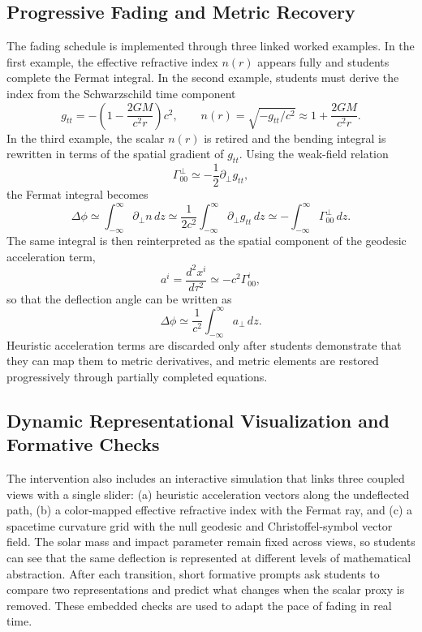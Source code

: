 \documentclass{article}
\begin{document}
\subsection{Progressive Fading and Metric Recovery}
The fading schedule is implemented through three linked worked examples. In the first example, the effective refractive index \(n(r)\) appears fully and students complete the Fermat integral. In the second example, students must derive the index from the Schwarzschild time component
\begin{equation}
g_{tt}
=
-\left(1-\frac{2GM}{c^{2}r}\right)c^{2},
\qquad
n(r)
=
\sqrt{-g_{tt}/c^{2}}
\approx
1+\frac{2GM}{c^{2}r}.
\end{equation}
In the third example, the scalar \(n(r)\) is retired and the bending integral is rewritten in terms of the spatial gradient of \(g_{tt}\). Using the weak-field relation
\begin{equation}
\Gamma^{\perp}_{00}
\simeq
-\frac{1}{2}\partial_{\perp}g_{tt},
\end{equation}
the Fermat integral becomes
\begin{equation}
\Delta \phi
\simeq
\int_{-\infty}^{\infty}
\partial_{\perp} n
\,dz
\simeq
\frac{1}{2c^{2}}
\int_{-\infty}^{\infty}
\partial_{\perp}g_{tt}
\,dz
\simeq
-\int_{-\infty}^{\infty}
\Gamma^{\perp}_{00}
\,dz.
\end{equation}
The same integral is then reinterpreted as the spatial component of the geodesic acceleration term,
\begin{equation}
a^{i}
=
\frac{d^{2}x^{i}}{d\tau^{2}}
\simeq
-c^{2}\Gamma^{i}_{00},
\end{equation}
so that the deflection angle can be written as
\begin{equation}
\Delta \phi
\simeq
\frac{1}{c^{2}}
\int_{-\infty}^{\infty}
a_{\perp}
\,dz.
\end{equation}
Heuristic acceleration terms are discarded only after students demonstrate that they can map them to metric derivatives, and metric elements are restored progressively through partially completed equations.

\subsection{Dynamic Representational Visualization and Formative Checks}
The intervention also includes an interactive simulation that links three coupled views with a single slider: (a) heuristic acceleration vectors along the undeflected path, (b) a color-mapped effective refractive index with the Fermat ray, and (c) a spacetime curvature grid with the null geodesic and Christoffel-symbol vector field. The solar mass and impact parameter remain fixed across views, so students can see that the same deflection is represented at different levels of mathematical abstraction. After each transition, short formative prompts ask students to compare two representations and predict what changes when the scalar proxy is removed. These embedded checks are used to adapt the pace of fading in real time.
\end{document}

